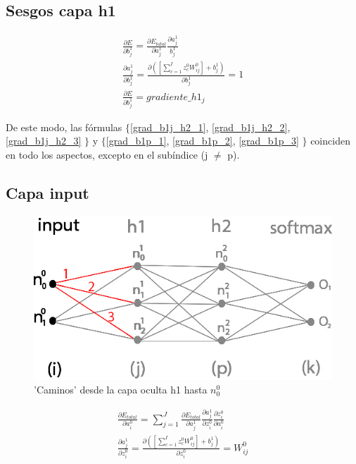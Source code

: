 \subsection{Sesgos capa h1}

\begin{gather}
	\frac{\partial E}{\partial b^1_j} = \frac{\partial E_{total} }{\partial a^1_j }   \frac{\partial a^1_j}{b^1_j} \label{grad_b1j_h2_1} \\
	\frac{\partial a^1_j }{\partial b^1_j } = \frac{\partial ([\sum_{c=1}^{I} z^0_c   W^0_{ij}] + b^1_j) }{\partial b^1_j } = 1 \label{grad_b1j_h2_2} \\
	\frac{\partial E}{\partial b^1_j} = gradiente\_h1_j
	\label{grad_b1j_h2_3}
\end{gather}

De este modo, las fórmulas $\{$\ref{grad_b1j_h2_1}, \ref{grad_b1j_h2_2}, \ref{grad_b1j_h2_3} $\}$ y $\{$\ref{grad_b1p_1}, \ref{grad_b1p_2}, \ref{grad_b1p_3} $\}$ coinciden en todo los aspectos, excepto en el subíndice (j $\neq$ p).

\subsection{Capa input}

\begin{figure}[H]
	\centering
	\includegraphics[scale=0.35]{imagenes/nn_2_capas_caminos_posibles_input.jpg}  
	\caption{'Caminos' desde la capa oculta h1 hasta $n^0_0$}
	\label{nn_2_capas_caminos_posibles_input}
\end{figure}

\begin{gather}
	\frac{\partial E_{total}}{\partial a^0_i} = \sum_{j=1}^J \frac{\partial E_{total}}{\partial a^1_j}   \frac{\partial a^1_j}{\partial z^0_i}   \frac{\partial z^0_i}{\partial a^0_i} \label{grad_a_h2_1} \\
	\frac{\partial a^1_j }{\partial z^0_i } = \frac{\partial ([\sum_{c=1}^{I} z^0_c   W^0_{ij}] + b^1_j) }{\partial z^0_i } = W^0_{ij} \label{grad_a_h2_2}
\end{gather}

